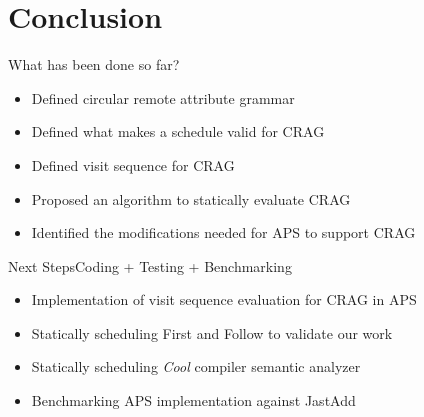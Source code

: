 \section{Conclusion}

\begin{frame}{What has been done so far?}

\begin{itemize}
    \item Defined circular remote attribute grammar
    \item Defined what makes a schedule valid for CRAG
    \item Defined visit sequence for CRAG
    \item \alert{Proposed} an algorithm to statically evaluate CRAG
    \item \alert{Identified} the modifications needed for APS to support CRAG
\end{itemize}
\end{frame}


\begin{frame}{Next Steps}{Coding + Testing + Benchmarking}

\begin{itemize}
    \item \alert{Implementation} of visit sequence evaluation for CRAG in APS
    \item Statically scheduling First and Follow to validate our work
    \item Statically scheduling \emph{Cool} compiler semantic analyzer
    \item Benchmarking APS implementation against JastAdd
\end{itemize}

\end{frame}


